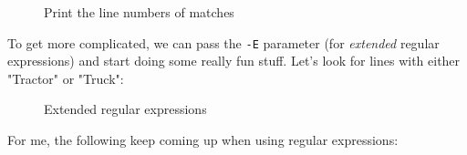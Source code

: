 \documentclass[10pt,american,]{book}
\newenvironment{Shaded}{\begin{snugshade}}{\end{snugshade}}
\newcommand{\KeywordTok}[1]{\textcolor[rgb]{0.13,0.29,0.53}{\textbf{{#1}}}}
\newcommand{\StringTok}[1]{\textcolor[rgb]{0.31,0.60,0.02}{{#1}}}
\newcommand{\NormalTok}[1]{{#1}}
\numberwithin{figure}{chapter}
\DeclareRobustCommand{\drcap}[1]{\begin{figure}[H]\caption{#1}\end{figure}}
\renewcommand{\KeywordTok}[1]{{#1}}
\renewcommand{\StringTok}[1]{{#1}}
\renewcommand{\NormalTok}[1]{{#1}}
\begin{document}
\drcap{Print the line numbers of matches}

\begin{Shaded}
\end{Shaded}

To get more complicated, we can pass the \texttt{-E} parameter (for
\emph{extended} regular expressions) and start doing some really fun
stuff. Let's look for lines with either "Tractor" or "Truck":

\drcap{Extended regular expressions}

\begin{Shaded}
\end{Shaded}

For me, the following keep coming up when using regular expressions:
\end{document}
